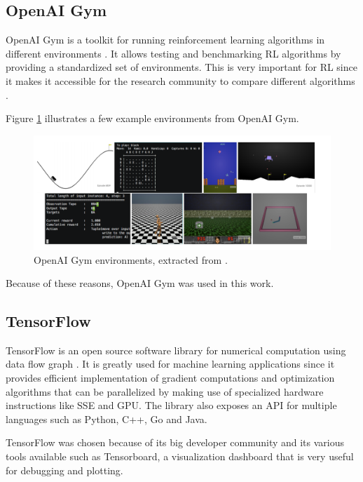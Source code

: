 \subsection{OpenAI Gym}

OpenAI Gym is a toolkit for running reinforcement learning algorithms in different environments \cite{OpenAIGym}.
It allows testing and benchmarking RL algorithms by providing a standardized set of environments.
This is very important for RL since it makes it accessible for the research community to compare different algorithms \cite{OpenAIGymPaper}.

Figure \ref{fig:openai_env} illustrates a few example environments from OpenAI Gym.

\begin{figure}[H]
    \centering
    \includegraphics[width=1\textwidth]{Chapter5/openai_env.png}
    \caption{OpenAI Gym environments, extracted from \cite{OpenAIGym}.}
    \label{fig:openai_env}
\end{figure}

Because of these reasons, OpenAI Gym was used in this work.

\subsection{TensorFlow}

TensorFlow is an open source software library for numerical computation using data flow graph \cite{TensorFlow}.
It is greatly used for machine learning applications since it provides efficient implementation of gradient computations and
optimization algorithms that can be parallelized by making use of specialized hardware instructions like SSE and GPU.
The library also exposes an API for multiple languages such as Python, C++, Go and Java.

TensorFlow was chosen because of its big developer community and its various tools available such as Tensorboard, a
visualization dashboard that is very useful for debugging and plotting.

